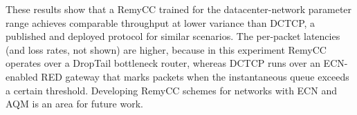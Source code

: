 These results show that a RemyCC trained for the datacenter-network
parameter range achieves comparable throughput at lower variance than
DCTCP, a published and deployed protocol for similar scenarios. The
per-packet latencies (and loss rates, not shown) are higher, because
in this experiment RemyCC operates over a DropTail bottleneck router,
whereas DCTCP runs over an ECN-enabled RED gateway that marks packets
when the instantaneous queue exceeds a certain threshold. Developing
RemyCC schemes for networks with ECN and AQM is an area for future
work.

